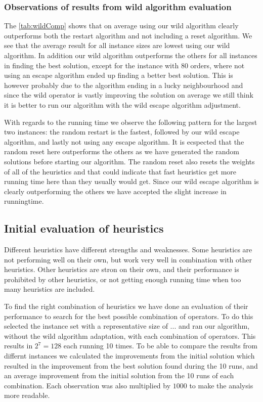 \documentclass[../main.tex]{subfiles}
\begin{document}
\subsubsection{Observations of results from wild algorithm evaluation}
The \cref{tab:wildComp} shows that on average using our wild algorithm clearly outperforms both the restart algorithm and not including a reset algorithm. 
We see that the average result for all instance sizes are lowest using our wild algorithm. 
In addition our wild algorithm outperforms the others for all instances in finding the best solution, except for the instance with 80 orders, where not using an escape algorithm ended up finding a better best solution. 
This is however probably due to the algorithm ending in a lucky neighbourhood and since the wild operator is vastly improving the solution on average we still think it is better to run our algorithm with the wild escape algorithm adjustment.
\par
With regards to the running time we observe the following pattern for the largest two instances: the random restart is the fastest, followed by our wild escape algorithm, and lastly not using any escape algorithm. It is ecspected that the random reset here outperforms the others as we have generated the random solutions before starting our algorithm. The random reset also resets the weights of all of the heuristics and that could indicate that fast heuristics get more running time here than they usually would get. Since our wild escape algorithm is clearly outperforming the others we have accepted the slight increase in runningtime.  

\subsection{Initial evaluation of heuristics}
\label{sec:evalH1}
Different heuristics have different strengths and weaknesses. Some heuristics are not performing well on their own, but work very well in combination with other heuristics. 
Other heuristics are stron on their own, and their performance is prohibited by other heuristics, or not getting enough running time when too many heuristics are included.

\par To find the right combination of heuristics we have done an evaluation of their performance to search for the best possible combination of operators. To do this selected the instance set with a representative size of ... and ran our algorithm, without the wild algorithm adaptation, with each combination of operators.
This results in $2^7 = 128$ each running 10 times. To be able to compare the results from differnt instances we calculated the improvements from the initial solution which resulted in the improvement from the best solution found during the 10 runs, and an average improvement from the initial solution from the 10 runs of each combination. Each observation was also multiplied by $1000$ to make the analysis more readable. 
\end{document}
